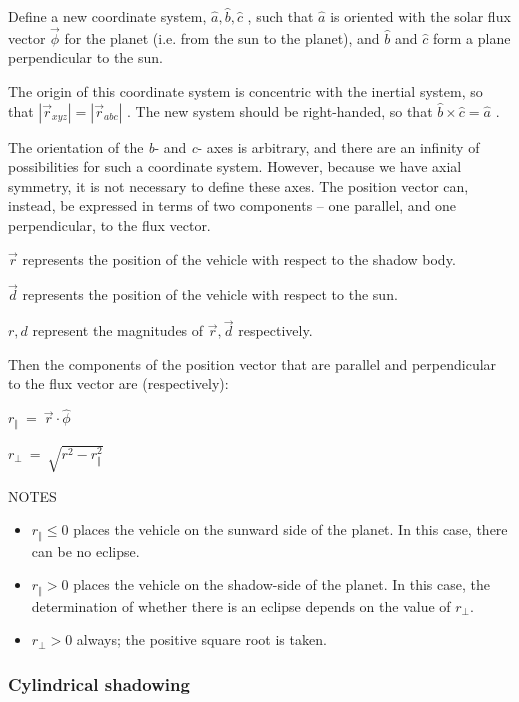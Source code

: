   Define a new coordinate system, \textit{ $\hat{a},\hat{b},\hat{c}$
  }, such that  $\hat{a}$ is oriented with the
  solar flux vector $\vec{\phi}$ for the planet (i.e. from the sun to the
  planet), and $\hat{b}$ and $\hat{c}$ form a
  plane perpendicular to the sun.

  The origin of this coordinate system is concentric with the
  inertial system, so that
  $|\vec{r}_{\mathit{xyz}}|=|\vec{r}_{\mathit{abc}}|$ .
  The new system should be right{}-handed, so that
  $\hat{b}\times \hat{c}=\hat{a}$ .

  The orientation of the \textit{b}{}- and
  \textit{c}{}- axes is arbitrary, and there are an infinity of
  possibilities for such a coordinate system.  However, because we have
  axial symmetry, it is not necessary to define these axes.
  The position vector can, instead, be expressed in terms of two components --
  one parallel, and one perpendicular, to the flux vector.

  \bigskip

  $\vec{r}$ represents the position of the vehicle with respect to the
  shadow body.

  $\vec{d}$ represents the position of the vehicle with respect to the
  sun.

  $r,d$ represent the magnitudes of  $\vec{r},\vec{d}$ respectively.

  \bigskip

  Then the components of the position vector that are parallel and perpendicular
  to the flux vector are (respectively):

  $r_\Vert\ =\ \vec{r}\cdot \hat{\phi }$

  $r_\bot\ =\ \sqrt{r^{2}-r_\Vert^{2}}$

  NOTES
  \begin{itemize}
   \item $r_\Vert \leqslant  0$ places the vehicle on the sunward side of
   the planet.
    In this case, there can be no eclipse.
   \item $r_\Vert > 0$ places the vehicle on the shadow-side of the planet.
    In this case, the determination of whether there is an eclipse depends
    on the value of $r_\bot$.
  \item $r_\bot > 0$ always; the positive square root is taken.
  \end{itemize}


  \bigskip

  \subsubsection{Cylindrical shadowing}\bigskip

